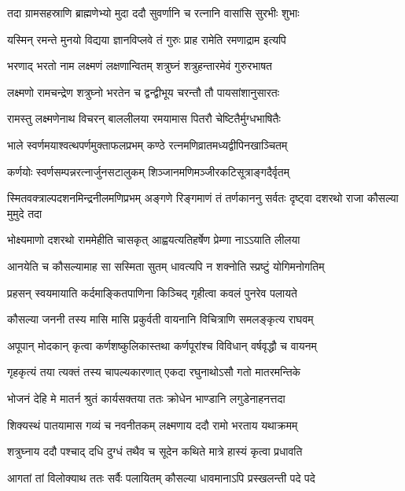 \twolineshloka
{तदा ग्रामसहस्राणि ब्राह्मणेभ्यो मुदा ददौ}
{सुवर्णानि च रत्नानि वासांसि सुरभीः शुभाः} %

\twolineshloka
{यस्मिन् रमन्ते मुनयो विद्यया ज्ञानविप्लवे}
{तं गुरुः प्राह रामेति रमणाद्राम इत्यपि} %

\twolineshloka
{भरणाद् भरतो नाम लक्ष्मणं लक्षणान्वितम्}
{शत्रुघ्नं शत्रुहन्तारमेवं गुरुरभाषत} %

\twolineshloka
{लक्ष्मणो रामचन्द्रेण शत्रुघ्नो भरतेन च}
{द्वन्द्वीभूय चरन्तौ तौ पायसांशानुसारतः} %

\twolineshloka
{रामस्तु लक्ष्मणेनाथ विचरन् बाललीलया}
{रमयामास पितरौ चेष्टितैर्मुग्धभाषितैः} %

\twolineshloka
{भाले स्वर्णमयाश्वत्थपर्णमुक्ताफलप्रभम्}
{कण्ठे रत्नमणिव्रातमध्यद्वीपिनखाञ्चितम्} %

\twolineshloka
{कर्णयोः स्वर्णसम्पन्नरत्नार्जुनसटालुकम्}
{शिञ्जानमणिमञ्जीरकटिसूत्राङ्गदैर्वृतम्} %

\threelineshloka
{स्मितवक्त्राल्पदशनमिन्द्रनीलमणिप्रभम्}
{अङ्गणे रिङ्गमाणं तं तर्णकाननु सर्वतः}
{दृष्ट्वा दशरथो राजा कौसल्या मुमुदे तदा} %

\twolineshloka
{भोक्ष्यमाणो दशरथो राममेहीति चासकृत्}
{आह्वयत्यतिहर्षेण प्रेम्णा नाऽऽयाति लीलया} %

\twolineshloka
{आनयेति च कौसल्यामाह सा सस्मिता सुतम्}
{धावत्यपि न शक्नोति स्प्रष्टुं योगिमनोगतिम्} %

\twolineshloka
{प्रहसन् स्वयमायाति कर्दमाङ्कितपाणिना}
{किञ्चिद् गृहीत्वा कवलं पुनरेव पलायते} %

\twolineshloka
{कौसल्या जननी तस्य मासि मासि प्रकुर्वती}
{वायनानि विचित्राणि समलङ्कृत्य राघवम्} %

\twolineshloka
{अपूपान् मोदकान् कृत्वा कर्णशष्कुलिकास्तथा}
{कर्णपूरांश्च विविधान् वर्षवृद्धौ च वायनम्} %

\twolineshloka
{गृहकृत्यं तया त्यक्तं तस्य चापल्यकारणात्}
{एकदा रघुनाथोऽसौ गतो मातरमन्तिके} %

\twolineshloka
{भोजनं देहि मे मातर्न श्रुतं कार्यसक्तया}
{ततः क्रोधेन भाण्डानि लगुडेनाहनत्तदा} %

\twolineshloka
{शिक्यस्थं पातयामास गव्यं च नवनीतकम्}
{लक्ष्मणाय ददौ रामो भरताय यथाक्रमम्} %

\twolineshloka
{शत्रुघ्नाय ददौ पश्चाद् दधि दुग्धं तथैव च}
{सूदेन कथिते मात्रे हास्यं कृत्वा प्रधावति} %

\twolineshloka
{आगतां तां विलोक्याथ ततः सर्वैः पलायितम्}
{कौसल्या धावमानाऽपि प्रस्खलन्ती पदे पदे} %

